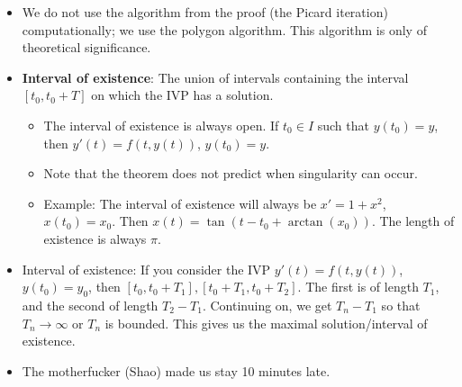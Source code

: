 \documentclass[../notes.tex]{subfiles}
\begin{document}
\begin{itemize}
\begin{itemize}
    \end{itemize}
    \item We do not use the algorithm from the proof (the Picard iteration) computationally; we use the polygon algorithm. This algorithm is only of theoretical significance.
    \item \textbf{Interval of existence}: The union of intervals containing the interval $[t_0,t_0+T]$ on which the IVP has a solution.
    \begin{itemize}
        \item The interval of existence is always open. If $t_0\in I$ such that $y(t_0)=y$, then $y'(t)=f(t,y(t))$, $y(t_0)=y$.
        \item Note that the theorem does not predict when singularity can occur.
        \item Example: The interval of existence will always be $x'=1+x^2$, $x(t_0)=x_0$. Then $x(t)=\tan(t-t_0+\arctan(x_0))$. The length of existence is always $\pi$.
    \end{itemize}
    \item Interval of existence: If you consider the IVP $y'(t)=f(t,y(t))$, $y(t_0)=y_0$, then $[t_0,t_0+T_1],[t_0+T_1,t_0+T_2]$. The first is of length $T_1$, and the second of length $T_2-T_1$. Continuing on, we get $T_n-T_1$ so that $T_n\to\infty$ or $T_n$ is bounded. This gives us the maximal solution/interval of existence.
    \item The motherfucker (Shao) made us stay 10 minutes late.
\end{itemize}
\end{document}
